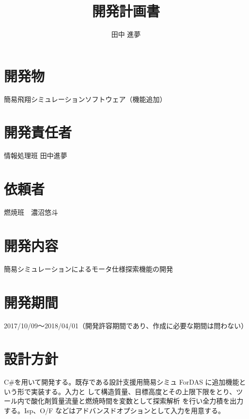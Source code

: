 \documentclass[10pt,a4paper]{jsarticle}
\begin{document}
	
	\title{開発計画書}
	\author{田中 進夢}
	\maketitle
	
	
	\section{開発物}
	簡易飛翔シミュレーションソフトウェア（機能追加）
	
	\section{開発責任者}
	情報処理班 田中進夢
	
	\section{依頼者}
	燃焼班　濃沼悠斗
	
	\section{開発内容}
	簡易シミュレーションによるモータ仕様探索機能の開発
	
	\section{開発期間}
	2017/10/09～2018/04/01（開発許容期間であり、作成に必要な期間は問わない）
	
	\section{設計方針}
	C\#を用いて開発する。既存である設計支援用簡易シミュ ForDAS に追加機能という形で実装する。入力と
	して構造質量、目標高度とその上限下限をとり、ツール内で酸化剤質量流量と燃焼時間を変数として探索解析
	を行い全力積を出力する。Isp、O/F などはアドバンスドオプションとして入力を用意する。
	
	
	
	
	\newpage
\end{document}
